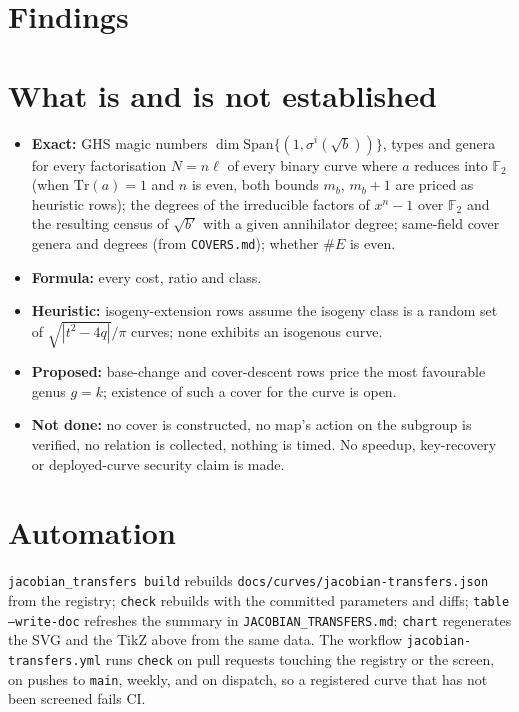 \documentclass[10pt]{article}
\begin{document}
\section*{Findings}


\section*{What is and is not established}
\begin{itemize}
\item \textbf{Exact:} GHS magic numbers $\dim\mathrm{Span}\{(1,\sigma^i(\sqrt b))\}$, types and genera for
every factorisation $N = n\ell$ of every binary curve where $a$ reduces into $\mathbb F_2$ (when $\mathrm{Tr}(a)=1$ and $n$ is even, both bounds $m_b$, $m_b+1$ are priced as heuristic rows); the degrees of the irreducible
factors of $x^n-1$ over $\mathbb F_2$ and the resulting census of $\sqrt{b'}$ with a given
annihilator degree; same-field cover genera and degrees (from \texttt{COVERS.md});
whether $\#E$ is even.
\item \textbf{Formula:} every cost, ratio and class.
\item \textbf{Heuristic:} isogeny-extension rows assume the isogeny class is a random set
of $\sqrt{|t^2-4q|}/\pi$ curves; none exhibits an isogenous curve.
\item \textbf{Proposed:} base-change and cover-descent rows price the most favourable genus
$g = k$; existence of such a cover for the curve is open.
\item \textbf{Not done:} no cover is constructed, no map's action on the subgroup is
verified, no relation is collected, nothing is timed.  No speedup, key-recovery or
deployed-curve security claim is made.
\end{itemize}

\section*{Automation}
\texttt{jacobian\_transfers build} rebuilds \texttt{docs/curves/jacobian-transfers.json}
from the registry; \texttt{check} rebuilds with the committed parameters and diffs;
\texttt{table --write-doc} refreshes the summary in \texttt{JACOBIAN\_TRANSFERS.md};
\texttt{chart} regenerates the SVG and the TikZ above from the same data.  The workflow
\texttt{jacobian-transfers.yml} runs \texttt{check} on pull requests touching the registry or
the screen, on pushes to \texttt{main}, weekly, and on dispatch, so a registered curve that
has not been screened fails CI.
\end{document}
